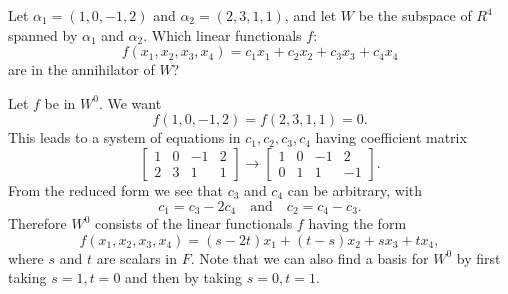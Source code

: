  Let $\alpha_1 = (1, 0, -1, 2)$ and
$\alpha_2 = (2, 3, 1, 1)$, and let $W$ be the subspace of $R^4$
spanned by $\alpha_1$ and $\alpha_2$. Which linear functionals $f$:
\begin{equation*}
  f(x_1,x_2,x_3,x_4) = c_1x_1 + c_2x_2 + c_3x_3 + c_4x_4
\end{equation*}
are in the annihilator of $W$?
\begin{solution}
  Let $f$ be in $W^0$. We want
  \begin{equation*}
    f(1, 0, -1, 2) = f(2, 3, 1, 1) = 0.
  \end{equation*}
  This leads to a system of equations in $c_1,c_2,c_3,c_4$ having
  coefficient matrix
  \begin{equation*}
    \begin{bmatrix}
      1 & 0 & -1 & 2 \\
      2 & 3 & 1 & 1
    \end{bmatrix}
    \rightarrow
    \begin{bmatrix}
      1 & 0 & -1 & 2 \\
      0 & 1 & 1 & -1
    \end{bmatrix}.
  \end{equation*}
  From the reduced form we see that $c_3$ and $c_4$ can be arbitrary,
  with
  \begin{equation*}
    c_1 = c_3 - 2c_4 \quad\text{and}\quad c_2 = c_4 - c_3.
  \end{equation*}
  Therefore $W^0$ consists of the linear functionals $f$ having the
  form
  \begin{equation*}
    f(x_1,x_2,x_3,x_4) = (s - 2t)x_1 + (t - s)x_2 + sx_3 + tx_4,
  \end{equation*}
  where $s$ and $t$ are scalars in $F$. Note that we can also find a
  basis for $W^0$ by first taking $s = 1, t = 0$ and then by taking
  $s = 0, t = 1$.
\end{solution}

